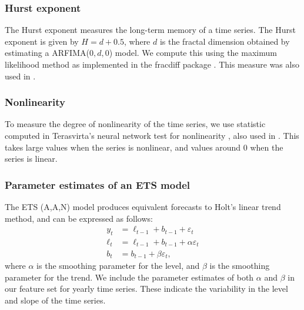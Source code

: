 \documentclass[11pt,a4paper,]{article}
\begin{document}
\hypertarget{hurst-exponent}{%
\subsubsection*{Hurst exponent}\label{hurst-exponent}}

The Hurst exponent measures the long-term memory of a time series. The Hurst exponent is given by \(H=d+0.5\), where \(d\) is the fractal dimension obtained by estimating a ARFIMA(\(0, d, 0\)) model. We compute this using the maximum likelihood method \autocite{haslett1989space} as implemented in the fracdiff package \autocite{fracdiff}. This measure was also used in \textcite{wang2009rule}.

\hypertarget{nonlinearity}{%
\subsubsection*{Nonlinearity}\label{nonlinearity}}

To measure the degree of nonlinearity of the time series, we use statistic computed in Terasvirta's neural network test for nonlinearity \autocite{nonlintest}, also used in \textcite{wang2009rule}. This takes large values when the series is nonlinear, and values around 0 when the series is linear.

\hypertarget{parameter-estimates-of-an-ets-model}{%
\subsubsection*{Parameter estimates of an ETS model}\label{parameter-estimates-of-an-ets-model}}

The ETS (A,A,N) model \autocite{expsmooth08} produces equivalent forecasts to Holt's linear trend method, and can be expressed as follows:
\begin{align*}
  y_t    & = \ell_{t-1}+b_{t-1}+\varepsilon_t\\
  \ell_t & = \ell_{t-1}+b_{t-1}+\alpha \varepsilon_t\\
  b_t    & = b_{t-1}+\beta \varepsilon_t,
\end{align*}
where \(\alpha\) is the smoothing parameter for the level, and \(\beta\) is the smoothing parameter for the trend. We include the parameter estimates of both \(\alpha\) and \(\beta\) in our feature set for yearly time series. These indicate the variability in the level and slope of the time series.
\end{document}
